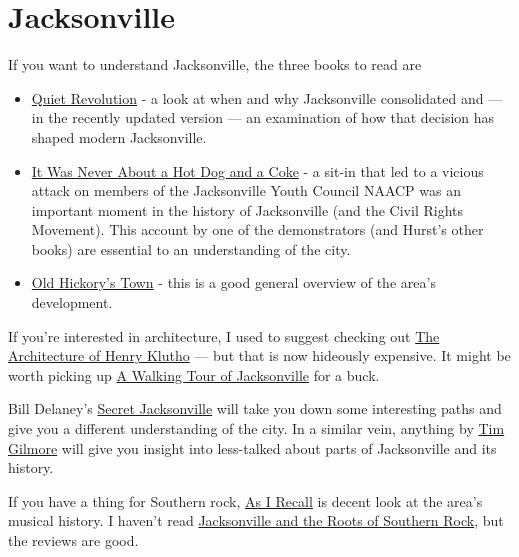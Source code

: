 \documentclass[
  11pt,
  american,
  letterpaperpaper,
  extrafontsizes,onecolumn,openright
  ]{memoir}
\providecommand{\tightlist}{%
  \setlength{\itemsep}{0pt}\setlength{\parskip}{0pt}}
\newlength{\rf}
\begin{document}
\hypertarget{jacksonville}{%
\section*{Jacksonville}\label{jacksonville}}

If you want to understand Jacksonville, the three books to read are

\begin{itemize}
\tightlist
\item
  \href{https://www.amazon.com/Quiet-Revolution-Consolidation-Jacksonville-Duval-Political/dp/0578565927/ref=sr_1_1}{Quiet Revolution} - a look at when and why Jacksonville consolidated and --- in the recently updated version --- an examination of how that decision has shaped modern Jacksonville.
\item
  \href{https://www.amazon.com/Personal-Account-Demonstrations-Jacksonville-Saturday/dp/1595941959/ref=sr_1_1}{It Was Never About a Hot Dog and a Coke} - a sit-in that led to a vicious attack on members of the Jacksonville Youth Council NAACP was an important moment in the history of Jacksonville (and the Civil Rights Movement). This account by one of the demonstrators (and Hurst's other books) are essential to an understanding of the city.
\item
  \href{https://www.amazon.com/Old-Hickorys-Town-Illustrated-Jacksonville/dp/B000OL8E9O/ref=sr_1_1}{Old Hickory's Town} - this is a good general overview of the area's development.
\end{itemize}

If you're interested in architecture, I used to suggest checking out \href{https://www.amazon.com/Architecture-Henry-John-Klutho-Jacksonville/dp/0813007313/ref=sr_1_1}{The Architecture of Henry Klutho} --- but that is now hideously expensive. It might be worth picking up \href{https://www.amazon.com/Walking-Tour-Jacksonville-Florida-America-ebook/dp/B005C470GG/ref=sr_1_4}{A Walking Tour of Jacksonville} for a buck.

Bill Delaney's \href{https://www.amazon.com/Secret-Jacksonville-Guide-Wonderful-Obscure/dp/1681063344/ref=sr_1_1}{Secret Jacksonville} will take you down some interesting paths and give you a different understanding of the city. In a similar vein, anything by \href{https://www.amazon.com/stores/Tim-Gilmore/author/B00908FHS8}{Tim Gilmore} will give you insight into less-talked about parts of Jacksonville and its history.

If you have a thing for Southern rock, \href{https://www.amazon.com/As-Recall-Jacksonvilles-American-History/dp/1530443024/ref=sr_1_1}{As I Recall} is decent look at the area's musical history. I haven't read \href{https://www.amazon.com/Jacksonville-Roots-Southern-Michael-FitzGerald/dp/0813080355/ref=sr_1_2}{Jacksonville and the Roots of Southern Rock}, but the reviews are good.
\end{document}
